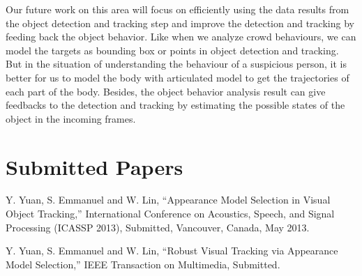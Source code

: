 Our future work on this area will focus on efficiently using the data results from the object detection and tracking step and improve the detection and tracking by feeding back the object behavior. Like when we analyze crowd behaviours, we can model the targets as bounding box or points in object detection and tracking. But in the situation of understanding the behaviour of a suspicious person, it is better for us to model the body with articulated model to get the trajectories of each part of the body. Besides, the object behavior analysis result can give feedbacks to the detection and tracking by estimating the possible states of the object in the incoming frames.
\section{Submitted Papers}

\begin{enumerate}[{[}1{]}]
  \item Y. Yuan, S. Emmanuel and W. Lin, “Appearance Model Selection in Visual Object Tracking,” International Conference on Acoustics, Speech, and Signal Processing (ICASSP 2013), Submitted,  Vancouver, Canada, May 2013.
  \item Y. Yuan, S. Emmanuel and W. Lin, “Robust Visual Tracking via Appearance Model Selection,” IEEE Transaction on Multimedia, Submitted.
\end{enumerate}
